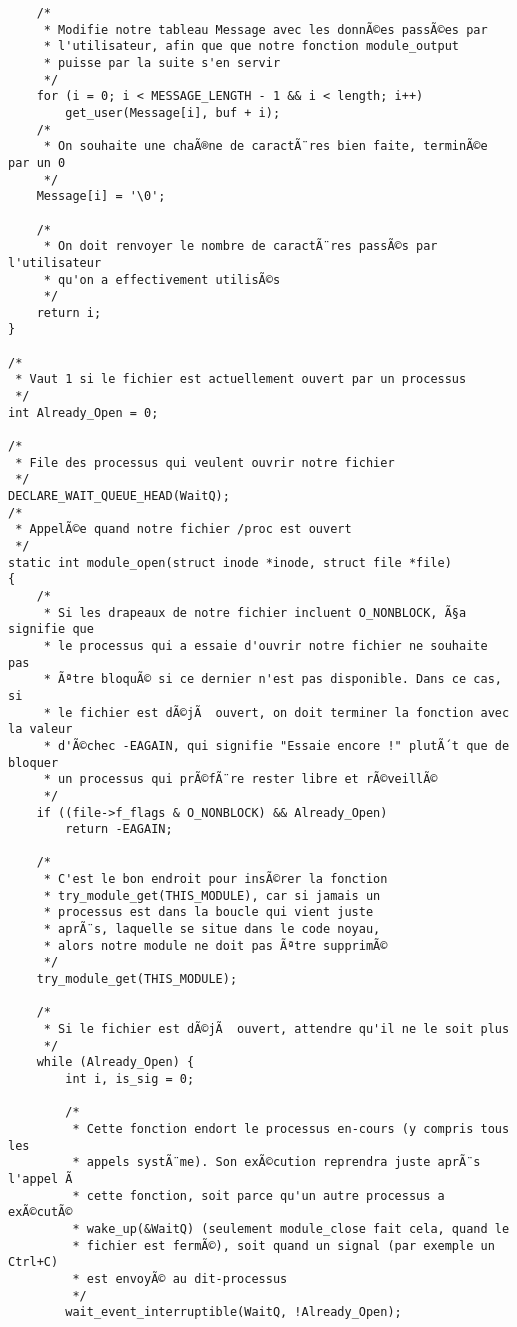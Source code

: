 \documentclass[11pt]{article}
\begin{document}
\begin{verbatim}
    /*
     * Modifie notre tableau Message avec les donnÃ©es passÃ©es par
     * l'utilisateur, afin que que notre fonction module_output
     * puisse par la suite s'en servir
     */
    for (i = 0; i < MESSAGE_LENGTH - 1 && i < length; i++)
        get_user(Message[i], buf + i);
    /*
     * On souhaite une chaÃ®ne de caractÃ¨res bien faite, terminÃ©e par un 0
     */
    Message[i] = '\0';

    /*
     * On doit renvoyer le nombre de caractÃ¨res passÃ©s par l'utilisateur
     * qu'on a effectivement utilisÃ©s
     */
    return i;
}

/*
 * Vaut 1 si le fichier est actuellement ouvert par un processus
 */
int Already_Open = 0;

/*
 * File des processus qui veulent ouvrir notre fichier
 */
DECLARE_WAIT_QUEUE_HEAD(WaitQ);
/*
 * AppelÃ©e quand notre fichier /proc est ouvert
 */
static int module_open(struct inode *inode, struct file *file)
{
    /*
     * Si les drapeaux de notre fichier incluent O_NONBLOCK, Ã§a signifie que
     * le processus qui a essaie d'ouvrir notre fichier ne souhaite pas
     * Ãªtre bloquÃ© si ce dernier n'est pas disponible. Dans ce cas, si
     * le fichier est dÃ©jÃ  ouvert, on doit terminer la fonction avec la valeur
     * d'Ã©chec -EAGAIN, qui signifie "Essaie encore !" plutÃ´t que de bloquer
     * un processus qui prÃ©fÃ¨re rester libre et rÃ©veillÃ©
     */
    if ((file->f_flags & O_NONBLOCK) && Already_Open)
        return -EAGAIN;

    /*
     * C'est le bon endroit pour insÃ©rer la fonction
     * try_module_get(THIS_MODULE), car si jamais un
     * processus est dans la boucle qui vient juste
     * aprÃ¨s, laquelle se situe dans le code noyau,
     * alors notre module ne doit pas Ãªtre supprimÃ©
     */
    try_module_get(THIS_MODULE);

    /*
     * Si le fichier est dÃ©jÃ  ouvert, attendre qu'il ne le soit plus
     */
    while (Already_Open) {
        int i, is_sig = 0;

        /*
         * Cette fonction endort le processus en-cours (y compris tous les
         * appels systÃ¨me). Son exÃ©cution reprendra juste aprÃ¨s l'appel Ã
         * cette fonction, soit parce qu'un autre processus a exÃ©cutÃ©
         * wake_up(&WaitQ) (seulement module_close fait cela, quand le
         * fichier est fermÃ©), soit quand un signal (par exemple un Ctrl+C)
         * est envoyÃ© au dit-processus
         */
        wait_event_interruptible(WaitQ, !Already_Open);


\end{verbatim}
\end{document}
